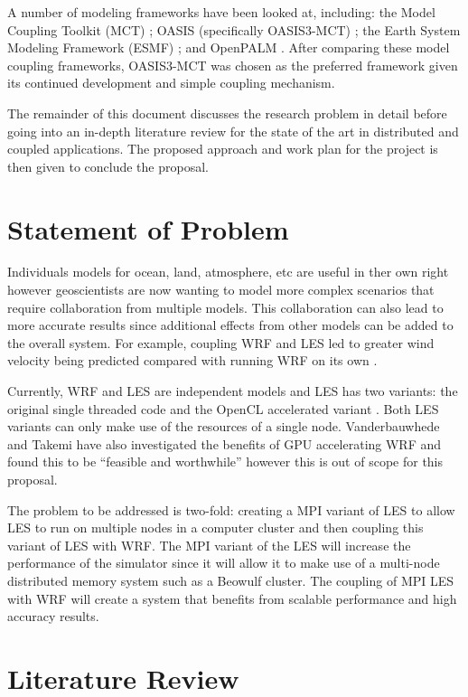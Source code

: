 \documentclass{acm_proc_article-sp}
\begin{document}
A number of modeling frameworks have been looked at, including: the Model
Coupling Toolkit (MCT) \cite{Larson2005,Jacob2005}; OASIS (specifically
OASIS3-MCT) \cite{Valcke,Valcke2013}; the Earth System Modeling Framework (ESMF)
\cite{Ramework2004}; and OpenPALM \cite{Piacentini2011}. After comparing these
model coupling frameworks, OASIS3-MCT was chosen as the preferred framework
given its continued development and simple coupling mechanism.

The remainder of this document discusses the research problem in detail before
going into an in-depth literature review for the state of the art in distributed
and coupled applications. The proposed approach and work plan for the project is
then given to conclude the proposal.

\section{Statement of Problem}

Individuals models for ocean, land, atmosphere, etc are useful in ther own right
however geoscientists are now wanting to model more complex scenarios that
require collaboration from multiple models. This collaboration can also lead to
more accurate results since additional effects from other models can be added to
the overall system. For example, coupling WRF and LES led to greater wind
velocity being predicted compared with running WRF on its own
\cite{Kinbara2010,Nakayama1998}.

Currently, WRF and LES are independent models and LES has two variants: the
original single threaded code and the OpenCL accelerated variant
\cite{Vanderbauwhede2014}. Both LES variants can only make use of the resources
of a single node. Vanderbauwhede and Takemi \cite{Vanderbauwhede2013} have also
investigated the benefits of GPU accelerating WRF and found this to be
``feasible and worthwhile'' however this is out of scope for this proposal.

The problem to be addressed is two-fold: creating a MPI variant of LES to allow
LES to run on multiple nodes in a computer cluster and then coupling this
variant of LES with WRF. The MPI variant of the LES will increase the
performance of the simulator since it will allow it to make use of a multi-node
distributed memory system such as a Beowulf cluster. The coupling of MPI LES
with WRF will create a system that benefits from scalable performance and high
accuracy results.

\section{Literature Review}
\end{document}
